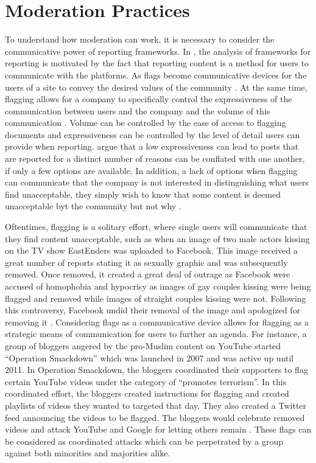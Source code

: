 \section{Moderation Practices}
To understand how moderation can work, it is necessary to consider the communicative power of reporting frameworks. In \cite{Crawford:2016}, the analysis of frameworks for reporting is motivated by the fact that reporting content is a method for users to communicate with the platforms. As flags become communicative devices for the users of a site to convey the desired values of the community \citep{Crawford:2016}. At the same time, flagging allows for a company to specifically control the expressiveness of the communication between users and the company and the volume of this communication \citep{Crawford:2016}. Volume can be controlled by the ease of access to flagging documents and expressiveness can be controlled by the level of detail users can provide when reporting. \cite{Crawford:2016} argue that a low expressiveness can lead to posts that are reported for a distinct number of reasons can be conflated with one another, if only a few options are available. In addition, a lack of options when flagging can communicate that the company is not interested in distinguishing what users find unacceptable, they simply wish to know that some content is deemed unacceptable byt the community but not why \citep{Crawford:2016}.

Oftentimes, flagging is a solitary effort, where single users will communicate that they find content unacceptable, such as when an image of two male actors kissing on the TV show EastEnders was uploaded to Facebook. This image received a great number of reports stating it as sexually graphic and was subsequently removed. Once removed, it created a great deal of outrage as Facebook were accused of homophobia and hypocrisy as images of gay couples kissing were being flagged and removed while images of straight couples kissing were not. Following this controversy, Facebook undid their removal of the image and apologized for removing it \citep{Crawford:2016}.
Considering flags as a communicative device allows for flagging as a strategic means of communication for users to further an agenda. For instance, a group of bloggers angered by the pro-Muslim content on YouTube started ``Operation Smackdown'' which was launched in 2007 and was active up until 2011. In Operation Smackdown, the bloggers coordinated their supporters to flag certain YouTube videos under the category of ``promotes terrorism''. In this coordinated effort, the bloggers created instructions for flagging and created playlists of videos they wanted to targeted that day. They also created a Twitter feed announcing the videos to be flagged. The bloggers would celebrate removed videos and attack YouTube and Google for letting others remain \citep{Crawford:2016}. These flags can be considered as coordinated attacks which can be perpetrated by a group against both minorities and majorities alike.

